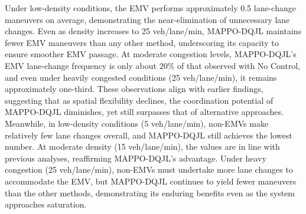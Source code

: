 Under low-density conditions, the EMV performs approximately 0.5 lane-change maneuvers on average, demonstrating the near-elimination of unnecessary lane changes. Even as density increases to 25 veh/lane/min, MAPPO-DQJL maintains fewer EMV maneuvers than any other method, underscoring its capacity to ensure smoother EMV passage. At moderate congestion levels, MAPPO-DQJL’s EMV lane-change frequency is only about 20\% of that observed with No Control, and even under heavily congested conditions (25 veh/lane/min), it remains approximately one-third. These observations align with earlier findings, suggesting that as spatial flexibility declines, the coordination potential of MAPPO-DQJL diminishes, yet still surpasses that of alternative approaches.
Meanwhile, in low-density conditions (5 veh/lane/min), non-EMVs make relatively few lane changes overall, and MAPPO-DQJL still achieves the lowest number. At moderate density (15 veh/lane/min), the values are in line with previous analyses, reaffirming MAPPO-DQJL’s advantage. Under heavy congestion (25 veh/lane/min), non-EMVs must undertake more lane changes to accommodate the EMV, but MAPPO-DQJL continues to yield fewer maneuvers than the other methods, demonstrating its enduring benefits even as the system approaches saturation.

